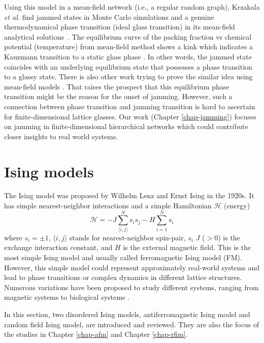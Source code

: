 Using this model in a mean-field network 
(i.e., a regular random graph), Krzakala \textit{et al.} find
jammed states in Monte Carlo simulations and a genuine thermodynamical
phase transition (ideal glass transition) in its mean-field analytical
solutions~\cite{Krzakala2008}. The equilibrium curve of the packing fraction vs chemical potential  (temperature) from mean-field method shows a kink which indicates a Kauzmann transition to a static glass phase \cite{Krzakala2008}. In other words, the jammed state coincides
with an underlying equilibrium state that possesses a phase transition
to a glassy state. There is also other work trying to prove the similar idea using mean-field models \cite{Rivoire03,berthier2011theory, Parisi2010}. That raises the prospect that this equilibrium phase transition might be the reason for the onset of jamming. However, such a connection between phase transition and jamming transition is hard to ascertain for finite-dimensional lattice glasses. Our work (Chapter \ref{chap-jamming}) focuses on jamming in finite-dimensional hierarchical networks which could contribute closer insights to real world systems.



\section{Ising models}
The Ising model was proposed by Wilhelm Lenz and Ernst Ising \cite{ising1925contribution, brush1967history} in the 1920s. It has simple nearest-neighbor interactions and a simple Hamiltonian $\mathcal{H}$ (energy)
\begin{equation}
\mathcal{H}=-J \sum_{\langle i, j\rangle}^N s_i s_j - H \sum_{i=1}^N s_i
\label{eq:intro-ising}
\end{equation}
where $s_i=\pm1$, $\langle i, j\rangle$ stands for nearest-neighbor spin-pair, $s_i$ $J$ ($>0$) is the exchange interaction constant, and $H$ is the external magnetic field. This is the most simple Ising model and usually called ferromagnetic Ising model (FM).
However, this simple model could represent approximately real-world systems and lead to phase transitions \cite{onsager1944} or complex dynamics \cite{Fredrickson1984} in different lattice structures. 
Numerous variations have been proposed to study different systems, ranging from magnetic systems \cite{blundell2001magnetism} to biological systems \cite{hopfield1982neural}.

In this section, two disordered Ising models, antiferromagnetic Ising model and random field Ising model,  are introduced and reviewed. They are also the focus of the studies in Chapter \ref{chap-afm} and Chapter \ref{chap-rfim}.


